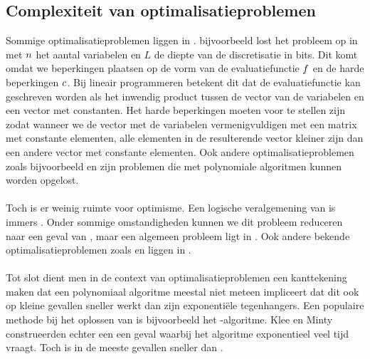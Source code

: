 \subsection{Complexiteit van optimalisatieproblemen}

Sommige optimalisatieproblemen liggen in . \cite{linearProgrammingInP} bijvoorbeeld lost het  probleem op in  met $n$ het aantal variabelen en $L$ de diepte van de discretisatie in bits. Dit komt omdat we beperkingen plaatsen op de vorm van de evaluatiefunctie $f$ en de harde beperkingen $c$. Bij lineair programmeren betekent dit dat de evaluatiefunctie kan geschreven worden als het inwendig product tussen de vector van de variabelen en een vector met constanten. Het harde beperkingen moeten voor te stellen zijn zodat wanneer we de vector met de variabelen vermenigvuldigen met een matrix met constante elementen, alle elementen in de resulterende vector kleiner zijn dan een andere vector met constante elementen. Ook andere optimalisatieproblemen zoals bijvoorbeeld  en  zijn problemen die met polynomiale algoritmen kunnen worden opgelost.

\paragraph{}
Toch is er weinig ruimte voor optimisme. Een logische veralgemening van  is immers . Onder sommige omstandigheden kunnen we dit probleem reduceren naar een geval van \cite{Kozlov1980223}, maar een algemeen  probleem ligt in \cite{qpInNP}. Ook andere bekende optimalisatieproblemen zoals  en  liggen in .

\paragraph{}
Tot slot dient men in de context van optimalisatieproblemen een kanttekening maken dat een polynomiaal algoritme meestal niet meteen impliceert dat dit ook op kleine gevallen sneller werkt dan zijn exponenti\"ele tegenhangers. Een populaire methode bij het oplossen van  is bijvoorbeeld het -algoritme. Klee en Minty\cite{klee:1972} construeerden echter een een geval waarbij het algoritme exponentieel veel tijd vraagt. Toch is  in de meeste gevallen sneller dan .

